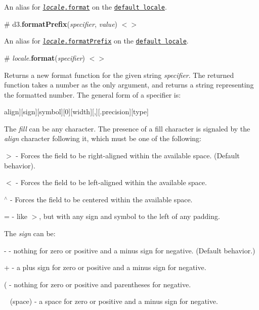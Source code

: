 An alias for \href{#locale_format}{\tt {\itshape locale}.format} on the \href{#formatDefaultLocale}{\tt default locale}.

\label{_formatPrefix}%
\# d3.{\bfseries format\+Prefix}({\itshape specifier}, {\itshape value}) \href{https://github.com/d3/d3-format/blob/master/src/defaultLocale.js#L5}{\tt $<$$>$}

An alias for \href{#locale_formatPrefix}{\tt {\itshape locale}.format\+Prefix} on the \href{#formatDefaultLocale}{\tt default locale}.

\label{_locale_format}%
\# {\itshape locale}.{\bfseries format}({\itshape specifier}) \href{https://github.com/d3/d3-format/blob/master/src/locale.js#L18}{\tt $<$$>$}

Returns a new format function for the given string {\itshape specifier}. The returned function takes a number as the only argument, and returns a string representing the formatted number. The general form of a specifier is\+:


\begin{DoxyCode}
[​[fill]align][sign][symbol][0][width][,][.precision][type]
\end{DoxyCode}


The {\itshape fill} can be any character. The presence of a fill character is signaled by the {\itshape align} character following it, which must be one of the following\+:


\begin{DoxyItemize}
\item {\ttfamily $>$} -\/ Forces the field to be right-\/aligned within the available space. (Default behavior).
\item {\ttfamily $<$} -\/ Forces the field to be left-\/aligned within the available space.
\item {\ttfamily $^\wedge$} -\/ Forces the field to be centered within the available space.
\item {\ttfamily =} -\/ like {\ttfamily $>$}, but with any sign and symbol to the left of any padding.
\end{DoxyItemize}

The {\itshape sign} can be\+:


\begin{DoxyItemize}
\item {\ttfamily -\/} -\/ nothing for zero or positive and a minus sign for negative. (Default behavior.)
\item {\ttfamily +} -\/ a plus sign for zero or positive and a minus sign for negative.
\item {\ttfamily (} -\/ nothing for zero or positive and parentheses for negative.
\item {\ttfamily  } (space) -\/ a space for zero or positive and a minus sign for negative.
\end{DoxyItemize}

